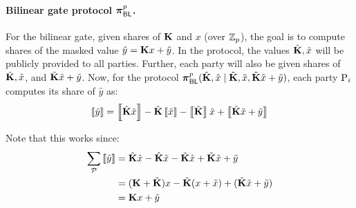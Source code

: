 

\paragraph{Bilinear gate protocol $\boldsymbol{\pi}_{\textsf{BL}}^p$.} 
For the bilinear gate, given shares of $\mat{K}$ and $x$ (over $\mathbb{Z}_p$), the goal is to compute shares of the masked value $\hat{y} = \mat{K}x + \tilde{y}$. In the protocol, the values $\hat{\mat{K}}, \hat{x}$ will be publicly provided to all parties. Further, each party will also be given shares of $\tilde{\mat{K}}, \tilde{x}$, and $\tilde{\mat{K}}\tilde{x} + \tilde{y}$. Now, for the protocol $\prot_\BLMap^p(\hat{\mat{K}},\hat{x}\mid \tilde{\mat{K}}, \tilde{x}, \tilde{\mat{K}}\tilde{x} + \tilde{y})$, each party $\textnormal{P}_i$ computes its share of $\hat{y}$ as:
\[
    \share{\hat{y}} = \share{\hat{\mat{K}}\hat{x}} - \hat{\mat{K}}\share{\tilde{x}} - \share{\tilde{\mat{K}}}\hat{x} + \share{\tilde{\mat{K}}\tilde{x} + \tilde{y}}
\]
 

\noindent Note that this works since:
\begin{align*}
\sum_\parties \share{\hat{y}} &= \hat{\mat{K}}\hat{x} - \hat{\mat{K}}\tilde{x} - \tilde{\mat{K}}\hat{x} + \tilde{\mat{K}}\tilde{x} + \tilde{y} \\
&= (\mat{K} + \tilde{\mat{K}})x - \tilde{\mat{K}}(x + \tilde{x}) + (\tilde{\mat{K}}\tilde{x} + \tilde{y}) \\
&= \mat{K}x + \tilde{y}
\end{align*}

